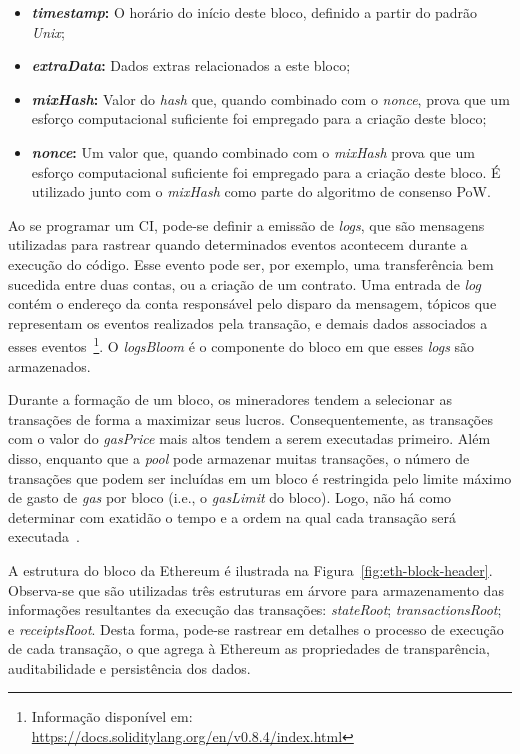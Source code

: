 \begin{itemize}
    \item \textbf{\textit{timestamp}:} O horário do início deste bloco, definido a partir do padrão \textit{Unix};
    \item \textbf{\textit{extraData}:} Dados extras relacionados a este bloco;
    \item \textbf{\textit{mixHash}:} Valor do \textit{hash} que, quando combinado com o \textit{nonce}, prova que um esforço computacional suficiente foi empregado para a criação deste bloco;
    \item \textbf{\textit{nonce}:} Um valor que, quando combinado com o \textit{mixHash} prova que um esforço computacional suficiente foi empregado para a criação deste bloco. É utilizado junto com o \textit{mixHash} como parte do algoritmo de consenso PoW.
\end{itemize}

Ao se programar um CI, pode-se definir a emissão de \textit{logs}, que são mensagens utilizadas para rastrear quando determinados eventos acontecem durante a execução do código. Esse evento pode ser, por exemplo, uma transferência bem sucedida entre duas contas, ou a criação de um contrato. Uma entrada de \textit{log} contém o endereço da conta responsável pelo disparo da mensagem, tópicos que representam os eventos realizados pela transação, e demais dados associados a esses eventos~\footnote{Informação disponível em: \url{https://docs.soliditylang.org/en/v0.8.4/index.html}}. O \textit{logsBloom} é o componente do bloco em que esses \textit{logs} são armazenados.

Durante a formação de um bloco, os mineradores tendem a selecionar as transações de forma a maximizar seus lucros. Consequentemente, as transações com o valor do \textit{gasPrice} mais altos tendem a serem executadas primeiro. Além disso, enquanto que a \textit{pool} pode armazenar muitas transações, o número de transações que podem ser incluídas em um bloco é restringida pelo limite máximo de gasto de \textit{gas} por bloco (i.e., o \textit{gasLimit} do bloco). Logo, não há como determinar com exatidão o tempo e a ordem na qual cada transação será executada~\cite{wang2019detecting-nondeterministic-26}.

A estrutura do bloco da Ethereum é ilustrada na Figura~\ref{fig:eth-block-header}. Observa-se que são utilizadas três estruturas em árvore para armazenamento das informações resultantes da execução das transações: \textit{stateRoot}; \textit{transactionsRoot}; e \textit{receiptsRoot}. Desta forma, pode-se rastrear em detalhes o processo de execução de cada transação, o que agrega à Ethereum as propriedades de transparência, auditabilidade e persistência dos dados. 


